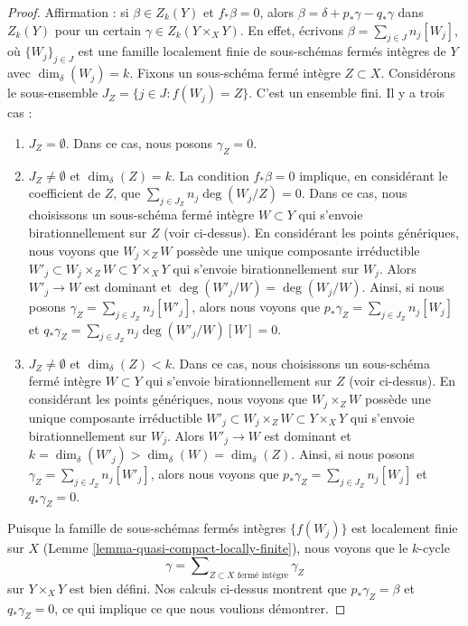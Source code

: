 \begin{proof}
\medskip\noindent
Affirmation : si $\beta \in Z_k(Y)$ et $f_*\beta = 0$, alors
$\beta = \delta + p_*\gamma - q_*\gamma$ dans $Z_k(Y)$ pour un certain
$\gamma \in Z_k(Y \times_X Y)$. En effet, écrivons $\beta = \sum_{j \in J} n_j[W_j]$,
où $\{W_j\}_{j \in J}$ est une famille localement finie de sous-schémas fermés
intègres de $Y$ avec $\dim_\delta(W_j) = k$.
Fixons un sous-schéma fermé intègre $Z \subset X$. Considérons le sous-ensemble
$J_Z = \{j \in J : f(W_j) = Z\}$. C'est un ensemble fini. Il y a trois
cas :
\begin{enumerate}
\item $J_Z = \emptyset$. Dans ce cas, nous posons $\gamma_Z = 0$.
\item $J_Z \not = \emptyset$ et $\dim_\delta(Z) = k$.
La condition $f_*\beta = 0$ implique, en considérant le
coefficient de $Z$, que $\sum_{j \in J_Z} n_j\deg(W_j/Z) = 0$.
Dans ce cas, nous choisissons un sous-schéma fermé intègre $W \subset Y$
qui s'envoie birationnellement sur $Z$ (voir ci-dessus). En considérant les points
génériques, nous voyons que $W_j \times_Z W$ possède une unique composante
irréductible $W'_j \subset W_j \times_Z W \subset Y \times_X Y$
qui s'envoie birationnellement sur $W_j$. Alors $W'_j \to W$ est dominant
et $\deg(W'_j/W) = \deg(W_j/W)$. Ainsi, si nous posons
$\gamma_Z = \sum_{j \in J_Z} n_j[W'_j]$,
alors nous voyons que
$p_*\gamma_Z = \sum_{j \in J_Z} n_j[W_j]$ et
$q_*\gamma_Z = \sum_{j \in J_Z} n_j\deg(W'_j/W)[W] = 0$.
\item $J_Z \not = \emptyset$ et $\dim_\delta(Z) < k$.
Dans ce cas, nous choisissons un sous-schéma fermé intègre $W \subset Y$
qui s'envoie birationnellement sur $Z$ (voir ci-dessus). En considérant les points
génériques, nous voyons que $W_j \times_Z W$ possède une unique composante
irréductible $W'_j \subset W_j \times_Z W \subset Y \times_X Y$
qui s'envoie birationnellement sur $W_j$. Alors $W'_j \to W$ est dominant
et $k = \dim_\delta(W'_j) > \dim_\delta(W) = \dim_\delta(Z)$.
Ainsi, si nous posons $\gamma_Z = \sum_{j \in J_Z} n_j[W'_j]$,
alors nous voyons que
$p_*\gamma_Z = \sum_{j \in J_Z} n_j[W_j]$ et
$q_*\gamma_Z = 0$.
\end{enumerate}
Puisque la famille de sous-schémas fermés intègres $\{f(W_j)\}$
est localement finie sur $X$
(Lemme \ref{lemma-quasi-compact-locally-finite}),
nous voyons que le $k$-cycle
$$
\gamma = \sum\nolimits_{Z \subset X\text{ fermé intègre}} \gamma_Z
$$
sur $Y \times_X Y$ est bien défini. Nos calculs ci-dessus montrent que
$p_*\gamma_Z = \beta$ et $q_*\gamma_Z = 0$, ce qui implique
ce que nous voulions démontrer.
\end{proof}














